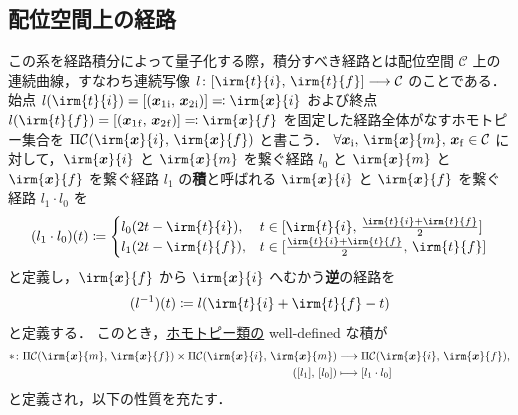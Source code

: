\documentclass[TQFT_main]{subfiles}
\begin{document}
\subsection{配位空間上の経路}

この系を経路積分によって量子化する際，積分すべき経路とは配位空間 $\mathcal{C}$ 上の連続曲線，すなわち連続写像 $l \colon [\irm{t}{i},\, \irm{t}{f}] \lto \mathcal{C}$ のことである．始点 $l(\irm{t}{i}) = [(\bm{x}_1{}_{\mathrm{i}},\, \bm{x}_2{}_{\mathrm{i}})] \eqqcolon \irm{\bm{x}}{i}$ および終点 $l(\irm{t}{f}) = [(\bm{x}_1{}_{\mathrm{f}},\, \bm{x}_2{}_{\mathrm{f}})] \eqqcolon \irm{\bm{x}}{f}$ を固定した経路全体がなすホモトピー集合を $\Pi \mathcal{C} (\irm{\bm{x}}{i},\, \irm{\bm{x}}{f})$ と書こう．
$\forall \bm{x}_{\mathrm{i}},\, \irm{\bm{x}}{m},\, \bm{x}_{\mathrm{f}} \in \mathcal{C}$ に対して，$\irm{\bm{x}}{i}$ と $\irm{\bm{x}}{m}$ を繋ぐ経路 $l_0$ と $\irm{\bm{x}}{m}$ と $\irm{\bm{x}}{f}$ を繋ぐ経路 $l_1$ の\textbf{積}と呼ばれる $\irm{\bm{x}}{i}$ と $\irm{\bm{x}}{f}$ を繋ぐ経路 $l_1 \cdot l_0$ を
\begin{align}
    (l_1 \cdot l_0)(t) \coloneqq 
    \begin{cases}
        l_0(2t - \irm{t}{i}), &t \in [\irm{t}{i},\, \frac{\irm{t}{i} + \irm{t}{f}}{2}] \\
        l_1(2t - \irm{t}{f}), &t \in [\frac{\irm{t}{i} + \irm{t}{f}}{2},\, \irm{t}{f}]
    \end{cases}
\end{align}
と定義し，$\irm{\bm{x}}{f}$ から $\irm{\bm{x}}{i}$ へむかう\textbf{逆}の経路を
\begin{align}
    (l^{-1})(t) \coloneqq l(\irm{t}{i} + \irm{t}{f} - t)
\end{align}
と定義する．
このとき，\underline{ホモトピー類の} well-defined な積が
\begin{align}
    * \colon \Pi \mathcal{C}(\irm{\bm{x}}{{m}},\, \irm{\bm{x}}{{f}}) \times  \Pi \mathcal{C}(\irm{\bm{x}}{{i}},\, \irm{\bm{x}}{{m}}) &\lto  \Pi \mathcal{C}(\irm{\bm{x}}{{i}},\, \irm{\bm{x}}{{f}}), \\
    ([l_1],\, [l_0]) &\lmto [l_1 \cdot l_0] \label{eq:1-pathprod}
\end{align}
と定義され，以下の性質を充たす．
\end{document}
